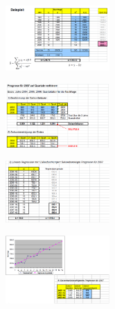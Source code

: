 \documentclass{report}
\newenvironment{Figure}
	{\par\medskip\noindent\minipage{\linewidth}}
	{\endminipage\par\medskip}
\theoremstyle{definition}
\theoremstyle{example}
\begin{document}
\begin{Figure}
\centering
\includegraphics[width=150px]{img/BspITrendprojektino.png}
	\label{fig:Beispiel einer Trendprojektion}
\end{Figure}

\begin{Figure}
\centering
\includegraphics[width=150px]{img/TrendprojektionMitSaisSchwaI.png}
	\label{fig:Beispiel einer Trendprojektion mit saisonalen Schwankungen I}
\end{Figure}

\begin{Figure}
\centering
\includegraphics[width=150px]{img/TrendprojektionMitSaisSchwaII.png}
	\label{fig:Beispiel einer Trendprojektion mit saisonalen Schwankungen II}
\end{Figure}

\begin{Figure}
\centering
\includegraphics[width=150px]{img/TrendprojektionMitSaisSchwaIII.png}
	\label{fig:Beispiel einer Trendprojektion mit saisonalen Schwankungen III}
\end{Figure}
\end{document}
